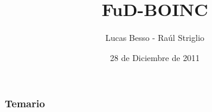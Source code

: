 \documentclass[xcolor=pdftex,hyperref={pdfpagelabels=false},table,10pt]{beamer}
\title{FuD-BOINC}
\subtitle{\tesistitle}
\author{Lucas Besso - Raúl Striglio}
\institute[UNRC]{
    \begin{minipage}{0.45\textwidth}
        \begin{center}
            \texttt{[image: images/escudo.jpg]}\\
            \begin{scriptsize}
                \textsc{Universidad Nacional de Río Cuarto} \\
            \end{scriptsize}
            \vfill
            \begin{tiny}
                \textsc{Fac. de Cs. Exactas, Fco-Qcas y Naturales} \\
                \textsc{Departamento de Computación} \\[1cm]
            \end{tiny}
        \end{center}
    \end{minipage}
    \begin{minipage}{0.45\textwidth}
        \begin{center}
            \texttt{[image: images/logo-fudepan.png]}\\
            \vfill
            \begin{scriptsize}
                \textsc{FuDePAN} \\
            \end{scriptsize}
            \begin{tiny}
                \textsc{Fundación para el Desarrollo de la Programación en Ácidos Nucleicos} \\[0.5cm]
            \end{tiny}
        \end{center}
    \end{minipage}
}
\date{28 de Diciembre de 2011}
\begin{document}
\begin{frame}
    \titlepage
\end{frame}


\begin{frame}
    \frametitle{Temario}
   \scriptsize{ \tableofcontents }
\end{frame}






\end{document}
